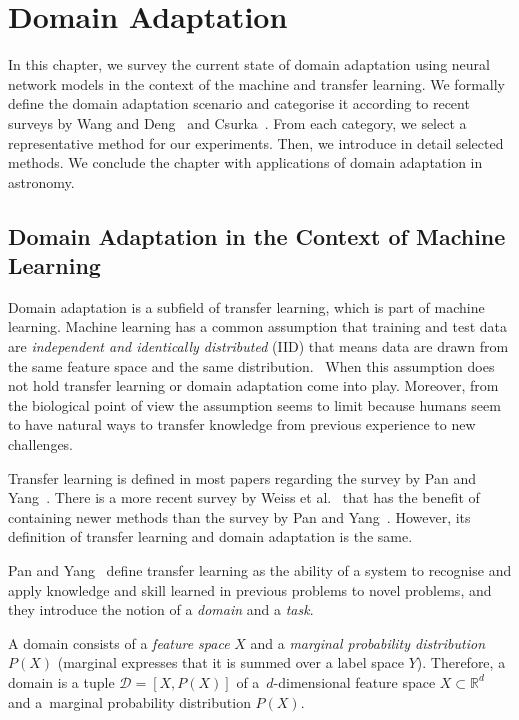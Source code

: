 \chapter{Domain Adaptation}
\label{da_chapter}

In this chapter, we survey the current state of domain adaptation using neural network models
in the context of the machine and transfer learning.
We formally define the domain adaptation scenario
and categorise it according to recent surveys
by Wang and Deng~\cite{wang2018} and Csurka~\cite{csurka2017}.
From each category, we select a representative method for our experiments.
Then, we introduce in detail selected methods.
We conclude the chapter with applications of domain adaptation in astronomy.

\section{Domain Adaptation in the Context of Machine Learning}

Domain adaptation is a subfield of transfer learning,
which is part of machine learning.
Machine learning has a common assumption that training and test data are
\textit{independent and identically distributed} (IID)
that means data are drawn from the same feature space and the same distribution.~\cite{daume2006}
When this assumption does not hold transfer learning or domain adaptation come into play.
Moreover, from the biological point of view the assumption seems to limit
because humans seem to have natural ways to transfer knowledge from previous experience to new challenges.~\cite{torrey2010}

Transfer learning is defined in most papers regarding the survey by Pan and Yang~\cite{pan2010}.
There is a more recent survey by Weiss et al.~\cite{weiss2016}
that has the benefit of containing newer methods than the survey by Pan and Yang~\cite{pan2010}.
However, its definition of transfer learning and domain adaptation is the same.

Pan and Yang~\cite{pan2010} define transfer learning
as the ability of a system to recognise and apply knowledge and skill
learned in previous problems to novel problems,
and they introduce the notion of a \textit{domain} and a \textit{task}.

A domain consists of a \textit{feature space} \(X\) and a \textit{marginal probability distribution} \(P(X)\)
(marginal expresses that it is summed over a label space \(Y\)).
Therefore, a domain is a tuple \(\mathcal{D} = [X, P(X)]\)
of a~\(d\)-dimensional feature space \(X \subset \mathbb{R}^d\)
and a~marginal probability distribution \(P(X)\).

